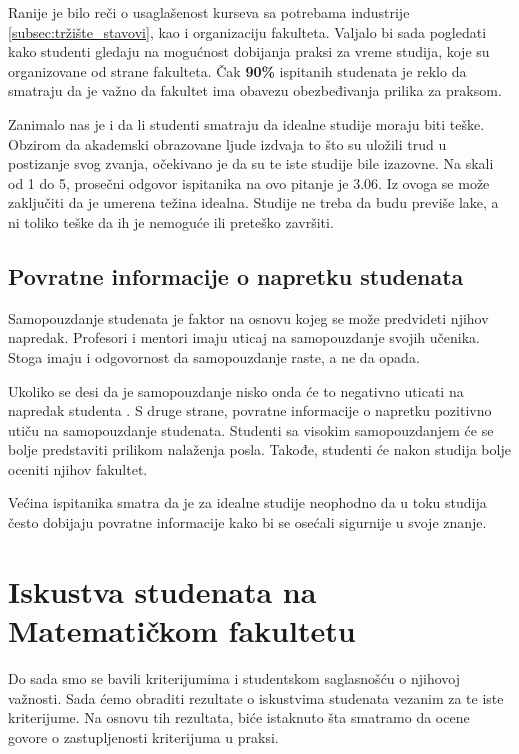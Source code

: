 \documentclass[a4paper]{article}
\begin{document}
Ranije je bilo reči o usaglašenost kurseva sa potrebama industrije \ref{subsec:tržište_stavovi}, kao i organizaciju fakulteta. Valjalo bi sada pogledati kako studenti gledaju na mogućnost dobijanja praksi za vreme studija, koje su organizovane od strane fakulteta. Čak \textbf{90\%} ispitanih studenata je reklo da smatraju da je važno da fakultet ima obavezu obezbeđivanja prilika za praksom.

Zanimalo nas je i da li studenti smatraju da idealne studije moraju biti teške. Obzirom da akademski obrazovane ljude izdvaja to što su uložili  trud u postizanje svog zvanja, očekivano je da su te iste studije bile izazovne. Na skali od 1 do 5, prosečni odgovor ispitanika na ovo pitanje je 3.06. Iz ovoga se može zaključiti da je umerena težina idealna. Studije ne treba da budu previše lake, a ni toliko teške da ih je nemoguće ili preteško završiti.

\subsection{Povratne informacije o napretku studenata}
\label{subsec:povrane_informacije}

Samopouzdanje studenata je faktor na osnovu kojeg se može predvideti njihov napredak\cite{correlation}.
Profesori i mentori imaju uticaj na samopouzdanje svojih učenika. Stoga imaju i odgovornost da samopouzdanje raste, a ne da opada.

Ukoliko se desi da je samopouzdanje nisko onda će to negativno uticati na napredak studenta \cite{confidence}. S druge strane, povratne informacije o napretku pozitivno utiču na samopouzdanje studenata. Studenti sa visokim samopouzdanjem će se bolje predstaviti prilikom nalaženja posla. Takođe, studenti će nakon studija bolje oceniti njihov fakultet. 

Većina ispitanika smatra da je za idealne studije neophodno da u toku studija često dobijaju povratne informacije kako bi se osećali sigurnije u svoje znanje. \newpage

\section{Iskustva studenata na Matematičkom fakultetu}
\label{sec:iskustva}

Do sada smo se bavili kriterijumima i studentskom saglasnošću o njihovoj važnosti. Sada ćemo obraditi rezultate o iskustvima studenata vezanim za te iste kriterijume. Na osnovu tih rezultata, biće istaknuto šta smatramo da ocene govore o zastupljenosti kriterijuma u praksi.  
\end{document}
